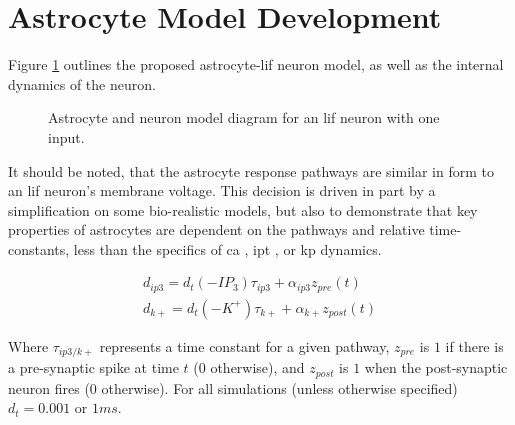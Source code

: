 \documentclass[conference]{IEEEtran}
\newcommand{\ca}{\gls{ca}\textrm{ }}
\newcommand{\ipt}{\gls{ipt}\textrm{ }}
\newcommand{\kp}{\gls{kp}\textrm{ }}
\newcommand{\asvgf}[4]{
	\begin{figure}[!htbp]
    	\centering
		\adjustbox{max width=#4\linewidth}{}
        \caption{#2.}
        \label{#3}
	\end{figure}
}
\begin{document}

\section{Astrocyte Model Development}
Figure \ref{fig:1n1s1a_fn_diagram} outlines the proposed astrocyte-\gls{lif} neuron
model, as well as the internal dynamics of the neuron.

\asvgf{figures/1n1s1a_diagram.svg}{Astrocyte and neuron model diagram for an \gls{lif}
  neuron with one input}{fig:1n1s1a_fn_diagram}{0.9}

It should be noted, that the astrocyte response pathways are similar in form to
an \gls{lif} neuron's membrane voltage. This decision is driven in part by a
simplification on some bio-realistic models, but also to demonstrate that key
properties of astrocytes are dependent on the pathways and relative
time-constants, less than the specifics of \ca, \ipt, or \kp dynamics.

\begin{align}
  d_{ip3} = d_t (-IP_3)\tau_{ip3} + \alpha_{ip3} z_{pre}(t) \label{eq:astro:spike-ip3} \\
  d_{k+} = d_t (-K^+)\tau_{k+} + \alpha_{k+} z_{post}(t) \label{eq:astro:spike-k+}
\end{align}

Where $\tau_{ip3/k+}$ represents a time constant for a given pathway, $z_{pre}$
is $1$ if there is a pre-synaptic spike at time $t$ ($0$ otherwise), and
$z_{post}$ is $1$ when the post-synaptic neuron fires ($0$ otherwise). For all
simulations (unless otherwise specified) $d_t = 0.001$ or $1ms$.
\end{document}
